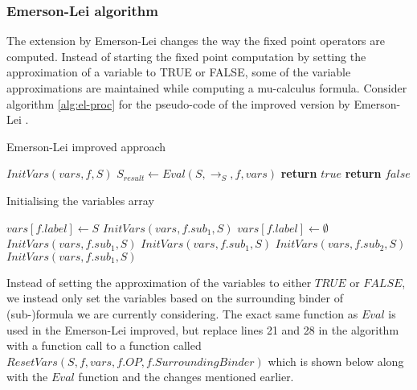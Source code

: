 \documentclass[10pt,a4paper]{article}
\begin{document}
\subsubsection{Emerson-Lei algorithm}
The extension by Emerson-Lei \cite{elpaper} changes the way the fixed point operators are computed. Instead of starting the fixed point computation by setting the approximation of a variable to TRUE or FALSE, some of the variable approximations are maintained while computing a mu-calculus formula. Consider algorithm \ref{alg:el-proc} for the pseudo-code of the improved version by Emerson-Lei \cite{elpaper}.

\begin{algorithm}[H]
\caption{Emerson-Lei improved approach}\label{alg:el-proc}
\begin{algorithmic}[1]
	\State $InitVars(vars,f,S)$ 
	\State $S_{result} \gets Eval(S, \to_S,f, vars)$
        	\State \textbf{return} $true$ 
        \Else
			\State \textbf{return} $false$ 
		\EndIf
	\EndProcedure
\end{algorithmic}
\end{algorithm}

\begin{algorithm}[H]
\caption{Initialising the variables array}\label{alg:el-proc}
\begin{algorithmic}[1]
			\State $vars[f.label] \gets S$
			\State $InitVars(vars,f.sub_1,S)$
			\State $vars[f.label] \gets \emptyset$
			\State $InitVars(vars,f.sub_1,S)$
		\Else
				\State $InitVars(vars,f.sub_1,S)$
				\State $InitVars(vars,f.sub_2,S)$
				\State $InitVars(vars,f.sub_1,S)$
			\EndIf
		\EndIf
	\EndProcedure
\end{algorithmic}
\end{algorithm}

\noindent Instead of setting the approximation of the variables to either $TRUE$ or $FALSE$, we instead only set the variables based on the surrounding binder of (sub-)formula we are currently considering. The exact same function as $Eval$ is used in the Emerson-Lei improved, but replace lines 21 and 28 in the algorithm with a function call to a function called \\
$ResetVars(S,f, vars, f.OP, f.SurroundingBinder)$ which is shown below along with the $Eval$ function and the changes mentioned earlier.
\end{document}
